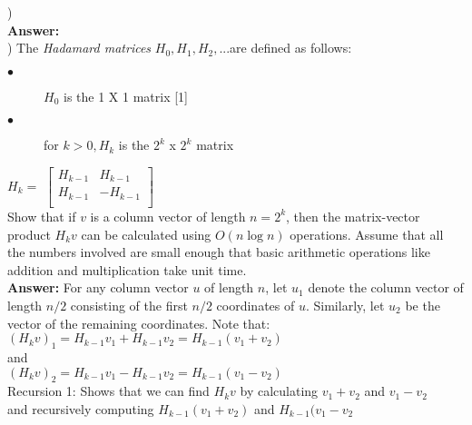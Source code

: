 \documentclass{article}
\begin{document}
\vspace{.3in}
) \\
\vspace{.1in}
{\bf Answer:} \\

\vspace{.3in}
) The \textit{Hadamard matrices} $H_{0}, H_{1}, H_{2}, $...are defined as follows: \\
\begin{description}
	\item[$\bullet$] $H_{0}$ is the 1 X 1 matrix [1]
	\item[$\bullet$] for $k > 0, H_{k}$ is the $2^k$ x $2^k$ matrix
\end{description}  
	
\indent \indent \indent \indent \indent \indent \indent \indent \indent $H_{k} = $
$\begin{bmatrix}
	H_{k - 1} & H_{k - 1} \\
	H_{k - 1} & -H_{k - 1} \\
\end{bmatrix}$ \\

\indent Show that if $v$ is a column vector of length $n = 2^k$, then the matrix-vector product $H_{k}v$ can be calculated using $O(n \log n)$ operations. Assume that all the numbers involved are small enough that basic arithmetic operations like addition and multiplication take unit time. \\
\vspace{.1in}
{\bf Answer:} For any column vector $u$ of length $n$, let $u_{1}$ denote the column vector of length $n/2$ consisting of the first $n/2$ coordinates of $u$. Similarly, let $u_{2}$ be the vector of the remaining coordinates. Note that: \\

\indent \indent \indent $(H_{k}v)_{1} = H_{k - 1}v_{1} + H_{k - 1}v_{2} = H_{k - 1}(v_{1} + v_{2})$ \\
and \\
\indent \indent \indent $(H_{k}v)_{2} = H_{k - 1}v_{1} - H_{k - 1}v_{2} = H_{k - 1}(v_{1} - v_{2})$ \\

Recursion 1: Shows that we can find $H_{k}v$ by calculating $v_{1} + v_{2}$ and $v_{1} - v_{2}$ \\
and recursively computing $H_{k - 1}(v_{1} + v_{2})$ and $H_{k - 1}(v_{1} - v_{2}$ \\
\end{document}
